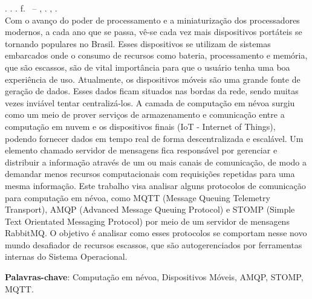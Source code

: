 
\begin{resumo}[RESUMO]
\begin{SingleSpacing}

\imprimirautorcitacao. \imprimirtitulo. \imprimirdata. \pageref {LastPage} f. \imprimirprojeto\ – \imprimirprograma, \imprimirinstituicao. \imprimirlocal, \imprimirdata.\\

Com o avanço do poder de processamento e a miniaturização dos processadores modernos, a cada ano que se passa, vê-se cada vez mais dispositivos portáteis se tornando populares no Brasil. Esses dispositivos se utilizam de sistemas embarcados onde o consumo de recursos como bateria, processamento e memória, que são escassos, são de vital importância para que o usuário tenha uma boa experiência de uso. Atualmente, os dispositivos móveis são uma grande fonte de geração de dados. Esses dados ficam situados nas bordas da rede, sendo muitas vezes inviável tentar centralizá-los. A camada de computação em névoa surgiu como um meio de prover serviços de armazenamento e comunicação entre a computação em nuvem e os dispositivos finais (IoT - Internet of Things), podendo fornecer dados em tempo real de forma descentralizada e escalável.  Um elemento chamado servidor de mensagens fica responsável por gerenciar e distribuir a informação através de um ou mais canais de comunicação, de modo a demandar menos recursos computacionais com requisições repetidas para uma mesma informação. Este trabalho visa analisar alguns protocolos de comunicação para computação em névoa, como MQTT (Message Queuing Telemetry Transport), AMQP (Advanced Message Queuing Protocol) e STOMP (Simple Text Orientated Messaging Protocol) por meio de um servidor de mensagens RabbitMQ. O objetivo é analisar como esses protocolos se comportam nesse novo mundo desafiador de recursos escassos, que são autogerenciados por ferramentas internas do Sistema Operacional.  

\textbf{Palavras-chave}: Computação em névoa, Dispositivos Móveis, AMQP, STOMP, MQTT. 
\end{SingleSpacing}
\end{resumo}


